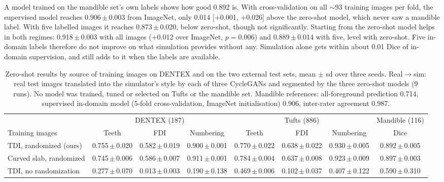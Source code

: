 \documentclass[preprint,12pt]{elsarticle}
\newcommand{\pmsd}[2]{#1\,$\pm$\,#2}
\begin{document}
A model trained on the mandible set's own labels shows how good 0.892 is. With cross-validation on all ${\sim}$93
training images per fold, the supervised model reaches \pmsd{0.906}{0.003} from ImageNet, only 0.014 [+0.001, +0.026]
above the zero-shot model, which never saw a mandible label. With five labelled images it reaches
\pmsd{0.873}{0.020}, below zero-shot, though not significantly. Starting from the zero-shot model helps in both regimes:
\pmsd{0.918}{0.003} with all images (+0.012 over ImageNet, $p = 0.006$) and \pmsd{0.889}{0.014} with five, level with
zero-shot. Five in-domain labels therefore do not improve on what simulation provides without any. Simulation alone
gets within about 0.01 Dice of in-domain supervision, and still adds to it when the labels are available.

\begin{table}[t]
\centering\small
\caption{Zero-shot results by source of training images on DENTEX and on the two external test sets, mean $\pm$ sd over
three seeds. Real$\to$sim: real test images translated into the simulator's style by each of three CycleGANs and
segmented by the three zero-shot models (9 runs). No model was trained, tuned or selected on Tufts or the mandible set.
Mandible references: all-foreground prediction 0.714, supervised in-domain model (5-fold
cross-validation, ImageNet initialisation) 0.906, inter-rater agreement 0.987.}
\label{tab:external}
\setlength{\tabcolsep}{4pt}
\begin{adjustbox}{max width=\linewidth}
\begin{tabular}{@{}lccccccc@{}}
\toprule
& \multicolumn{3}{c}{DENTEX (187)} & \multicolumn{3}{c}{Tufts (886)} & Mandible (116) \\
\cmidrule(lr){2-4}\cmidrule(lr){5-7}\cmidrule(l){8-8}
Training images & Teeth & FDI & Numbering & Teeth & FDI & Numbering & Dice \\
\midrule
TDI, randomized (ours) & \pmsd{0.755}{0.020} & \pmsd{0.582}{0.019} & \pmsd{0.900}{0.001} & \pmsd{0.770}{0.022} & \pmsd{0.638}{0.022} & \pmsd{0.930}{0.005} & \pmsd{0.892}{0.005} \\
Curved slab, randomized & \pmsd{0.745}{0.006} & \pmsd{0.586}{0.007} & \pmsd{0.911}{0.001} & \pmsd{0.784}{0.004} & \pmsd{0.637}{0.008} & \pmsd{0.923}{0.009} & \pmsd{0.897}{0.003} \\
TDI, no randomization & \pmsd{0.277}{0.070} & \pmsd{0.013}{0.003} & \pmsd{0.190}{0.138} & \pmsd{0.469}{0.006} & \pmsd{0.102}{0.037} & \pmsd{0.407}{0.122} & \pmsd{0.590}{0.310} \\

\end{tabular}
\end{adjustbox}
\end{table}
\end{document}
